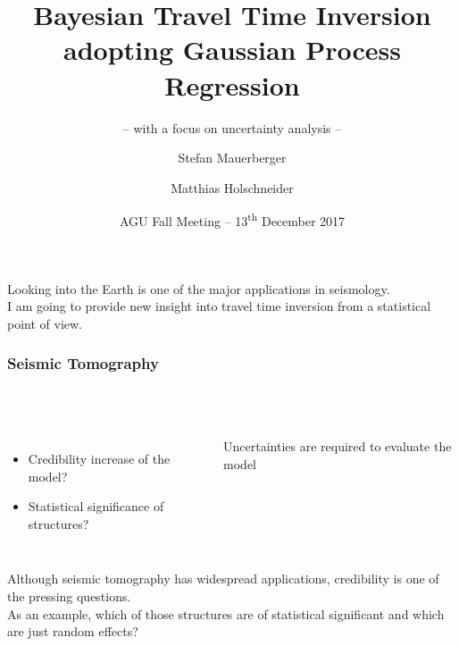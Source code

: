 \documentclass[aspectratio=169, t, 10pt,
    ]{beamer}
\title[Correlation based travel time inversion]{Bayesian Travel Time Inversion adopting Gaussian Process Regression}
\subtitle{-- with a focus on uncertainty analysis --}
\author[\tt mauerber@uni-potsdam.de]{Stefan Mauerberger \and Matthias Holschneider}
\institute[Math@UP]{University Potsdam, Institute of Mathematics}
\date[AGU~2017]{AGU Fall Meeting -- 13\textsuperscript{th} December 2017}
\begin{document}

Looking into the Earth is one of the major applications in seismology.
\\
I am going to provide new insight into travel time inversion from a statistical point of view.


\begin{frame}
    \frametitle{Seismic Tomography}
    \framesubtitle{~}%
%
\begin{columns}%
%
%
    \begin{itemize}
        \item Credibility increase of the model?
        \item Statistical significance of structures?
    \end{itemize}

    \begin{center}
        \large Uncertainties are required to evaluate the model
    \end{center}


    \vspace{-10mm}
\end{columns}

\end{frame}


Although seismic tomography has widespread applications, credibility is one of the pressing questions.
\\
As an example, which of those structures are of statistical significant and which are just random effects?
\\[2mm]
\end{document}

